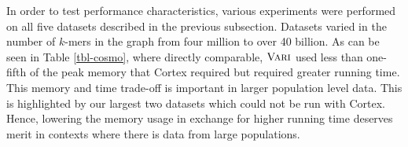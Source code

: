 





In order to test performance characteristics, various experiments were performed on all five datasets described in the previous subsection.  Datasets varied in the number of $k$-mers in the graph from four million to over 40 billion.  As can be seen in Table \ref{tbl-cosmo}, where directly comparable, $\mbox{\rm {\sc Vari}}$ used less than one-fifth of the peak memory that {\sc Cortex}  required but required greater running time.  This memory and time trade-off is important in larger population level data.  %
This is highlighted by our largest two datasets which could not be run with {\sc Cortex}.
Hence, lowering the memory usage in exchange for higher running time deserves merit in contexts where there is data from large populations. 
 
